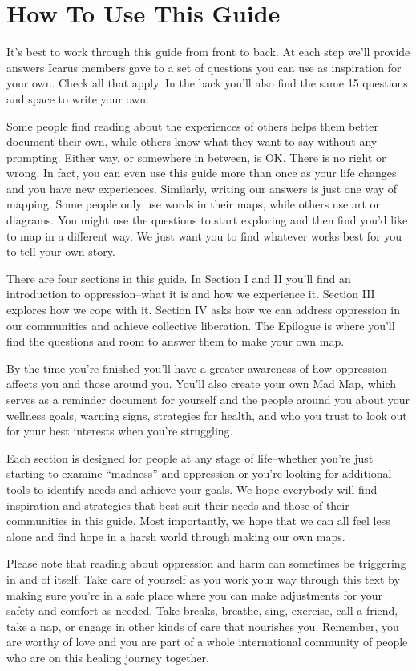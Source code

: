 \section{How To Use This Guide}

It’s best to work through this guide from front to  back. At each step we’ll provide answers Icarus members gave to a set of questions you can use as inspiration for your own. Check all that apply. In the back you’ll also find the same 15 questions and space to write your own.

Some  people  find  reading  about  the  experiences  of  others  helps  them  better document  their  own,  while  others  know  what  they  want  to  say  without  any prompting.  Either  way,  or  somewhere  in  between,  is  OK.  There  is  no  right  or wrong. In fact, you can even use this guide more than once as your life changes and you have new experiences. Similarly, writing our answers is just one way of mapping. Some people only use words in their maps, while others use art or diagrams.  You  might  use  the  questions  to  start  exploring  and  then  find  you’d like to map in a different way. We just want you to find whatever works best for you to tell your own story.

There are four sections in this guide. In Section I and II  you’ll find an introduction to oppression--what it is and how we experience it. Section III explores how we  cope  with  it.  Section  IV  asks  how  we  can  address  oppression  in  our  communities and achieve collective liberation. The Epilogue is where you’ll find the questions and room to answer them to make your own map.

By the time you’re finished you’ll have a greater awareness of how oppression affects  you and those around you. You’ll also create your own Mad Map, which serves as a reminder document for yourself and the people around you about your wellness goals, warning signs, strategies for health, and who you trust to look out for your best interests when you’re struggling.

Each  section  is  designed  for  people  at  any  stage  of  life--whether  you’re  just starting to examine “madness” and oppression or you’re looking for additional tools  to  identify  needs  and  achieve  your  goals.  We  hope  everybody  will  find inspiration and strategies that best suit their needs and those of their communities  in  this  guide.  Most  importantly,  we  hope  that  we  can  all  feel  less  alone and find hope in a harsh world through making our own maps.

Please  note  that  reading  about  oppression  and  harm  can  sometimes  be  triggering in and of itself. Take care of yourself as you work your way through this text by making sure you’re in a safe place where you can make adjustments for your safety and comfort as needed. Take breaks, breathe, sing, exercise, call a friend, take a nap, or engage in other kinds of care that nourishes you. Remember, you are worthy of love and you are part of a whole international community of people who are on this healing journey together.
